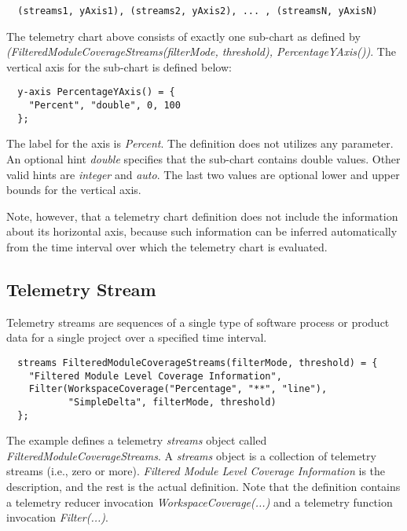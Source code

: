 \begin{verbatim}
  (streams1, yAxis1), (streams2, yAxis2), ... , (streamsN, yAxisN)
\end{verbatim}

The telemetry chart above consists of exactly one sub-chart as defined by \textit{(FilteredModuleCoverageStreams(filterMode, threshold), PercentageYAxis())}. The vertical axis for the sub-chart is defined below:

\begin{verbatim}
  y-axis PercentageYAxis() = {
    "Percent", "double", 0, 100
  };
\end{verbatim}

The label for the axis is \textit{Percent}. The definition does not utilizes any parameter. An optional hint \textit{double} specifies that the sub-chart contains double values. Other valid hints are \textit{integer} and \textit{auto}. The last two values are optional lower and upper bounds for the vertical axis.

Note, however, that a telemetry chart definition does not include the information about its horizontal axis, because such information can be inferred automatically from the time interval over which the telemetry chart is evaluated. 


\subsection{Telemetry Stream}

Telemetry streams are sequences of a single type of software process or product data for a single project over a specified time interval.

\begin{verbatim}
  streams FilteredModuleCoverageStreams(filterMode, threshold) = {
    "Filtered Module Level Coverage Information", 
    Filter(WorkspaceCoverage("Percentage", "**", "line"), 
           "SimpleDelta", filterMode, threshold) 
  };
\end{verbatim}

The example defines a telemetry \textit{streams} object called \textit{FilteredModuleCoverageStreams}. A \textit{streams} object is a collection of telemetry streams (i.e., zero or more).  \textit{Filtered Module Level Coverage Information} is the description, and the rest is the actual definition. Note that the definition contains a telemetry reducer invocation \textit{WorkspaceCoverage(...)} and a telemetry function invocation \textit{Filter(...)}.


